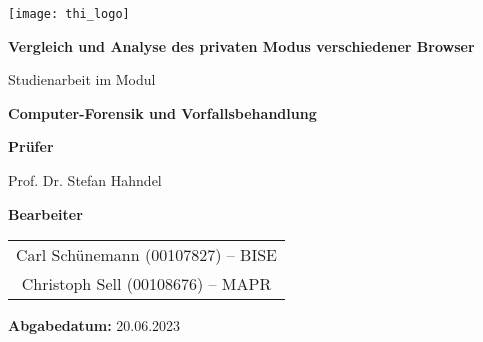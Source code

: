 


\thispagestyle{empty}

\begin{center}
	\texttt{[image: thi\_logo]}
\end{center}

\vspace{1.2cm}

\begin{center}
	{\huge \textbf{Vergleich und Analyse des privaten Modus verschiedener Browser}}
\end{center}

\vspace{1.2cm}

\begin{center}{\Large Studienarbeit im Modul}\end{center}
\begin{center}{\Large \textbf{Computer-Forensik und Vorfallsbehandlung}}\end{center}

\vspace{0.6cm}

\begin{center}{\Large \textbf{Prüfer}}\end{center}
\begin{center}{\Large Prof. Dr. Stefan Hahndel}\end{center}
	
\vspace{0.6cm}

\begin{center}{\Large \textbf{Bearbeiter}}\end{center}
\begin{center}
	\begin{Large}
		\begin{tabular}{c}
			Carl Schünemann	(00107827) -- BISE							\tabularnewline
			Christoph Sell	(00108676) -- MAPR							\tabularnewline
		\end{tabular}
	\end{Large}
\end{center}

\vspace{0.6cm}

\begin{center}{\Large \textbf{Abgabedatum:} 20.06.2023}\end{center}

